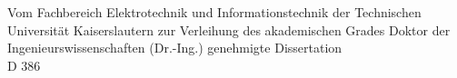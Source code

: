 %
%
%
%
%
%
\begin{center}%
%
\vspace*{0.05\textheight}\par%
%
%
\DenKrTPTitleAndSubtitle{\DenKrTPtitleGer}{\DenKrTPsubtitleGer}%
%
\vspace*{3\baselineskip}%
%
%
%
%
\vfill\vfill%
{%
\large {}\selectfont Vom Fachbereich Elektrotechnik und Informationstechnik der Technischen Universität Kaiserslautern zur Verleihung des akademischen Grades Doktor der Ingenieurswissenschaften (Dr.-Ing.) genehmigte Dissertation\\%
\vspace*{2ex}%
D 386%
}%
%

%
\end{center}%
\clearpage%